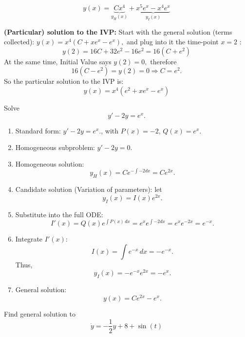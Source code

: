 \begin{example}
\begin{enumerate}
            \[\boxed{
              y(x) = \underbrace{Cx^{4}}_{y_{H}(x)} + \underbrace{x^{5}e^{x} - x^{4}e^{x}}_{y_{I}(x)}
              }
            \]
        \end{enumerate}

        \textbf{(Particular) solution to the IVP:}
          Start with the general solution (terms collected):
          \(
            y(x) = x^{4}(C + xe^{x} - e^{x}),
            \) and plug into it the time-point \(x=2\) :
          \[
            y(2) = 16 C + 32 e^{2} - 16 e^{2} = 16(C+e^{2})
          \]
          At the same time, Initial Value says \(y(2) = 0, \) therefore
          \[
            16(C-e^{2}) = y(2) = 0 \Rightarrow C = e^{2}.
          \]
          So the particular solution to the IVP is:
          \[ y(x) = x^{4}(e^{2} + xe^{x} - e^{x}) \]
    \end{example}
    
    \begin{example}
        Solve
        \[
        y' - 2y = e^x.
        \]
        
        \begin{enumerate}
            \item Standard form: \(y' - 2y = e^x.\), with \(P(x) = -2\), \(Q(x) = e^x\).
            \item Homogeneous subproblem: \(y' - 2y = 0\).
            \item Homogeneous solution:
            \[
            y_H(x) = C e^{-\int -2 dx} = C e^{2x}.
            \]
            \item Candidate solution (Variation of parameters): let
            \[
            y_I(x) = I(x) e^{2x}.
            \]
            \item Substitute into the full ODE:
            \[
            I'(x) = Q(x) e^{\int P(x)\,dx} = e^x e^{\int -2 dx} = e^x e^{-2x} = e^{-x}.
            \]
            \item Integrate \(I'(x)\):
            \[
            I(x) = \int e^{-x}\,dx = -e^{-x}.
            \]
            Thus,
            \[
            y_I(x) = -e^{-x} e^{2x} = -e^x.
            \]
            \item General solution:
            \[
            y(x) = C e^{2x} - e^x.
            \]
        \end{enumerate}
    \end{example}
       

    \begin{question}
        Find general solution to \[\dot{y} = -\frac{1}{2}y + 8 + \sin(t)\]
    \end{question}
    
